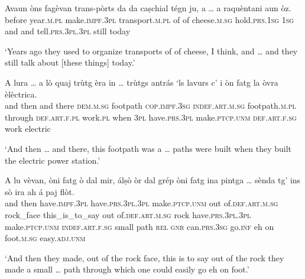 \begin{linenumbers}
\gll Avaun òns fagèvan trans-pòrts da da caṣchial\footnotemark{} tégn ju, a … a raquèntani aun òz.   \\
 before year.\textsc{m.pl} make.\textsc{impf.3pl} transport.\textsc{m.pl} of of cheese.\textsc{m.sg} hold.\textsc{prs.1sg} \textsc{1sg} and {} and  tell.\textsc{prs.3pl.3pl} still today\\
\end{linenumbers}
\medskip
\glt `Years ago they used to organize transports of of cheese, I think, and … and they still talk about [these things] today.'
\medskip

\begin{linenumbers}
\gll A lura … a lò quaj trùtg èra in … trùtgs antrás `ls lavurs c' i òn fatg la òvra èlèctrica.\\
and then {}  and there \textsc{dem.m.sg} footpath  \textsc{cop.impf.3sg} \textsc{indef.art.m.sg} {} footpath.\textsc{m.pl} through \textsc{def.art.f.pl}  work.\textsc{pl} when \textsc{3pl} have.\textsc{prs.3pl} make.\textsc{ptcp.unm} \textsc{def.art.f.sg} work electric \\
\end{linenumbers}
\medskip
\glt `And then … and there, this footpath was a … paths were built when they built the electric power station.'
\medskip

\begin{linenumbers}
\gll  A lu vèvan, òni fatg ò dal mir, álṣò òr dal grép òni fatg ina pintga …  sènda tg’ ins sò ira ah á paj flòt.\\
and then have.\textsc{impf.3pl} have.\textsc{prs.3pl.3pl} make.\textsc{ptcp.unm} out of.\textsc{def.art.m.sg} rock\_face this\_is\_to\_say out of.\textsc{def.art.m.sg} rock have.\textsc{prs.3pl.3pl} make.\textsc{ptcp.unm} \textsc{indef.art.f.sg} small {} path \textsc{rel} \textsc{gnr} can.\textsc{prs.3sg} go.\textsc{inf} eh on foot.\textsc{m.sg} easy.\textsc{adj.unm} \\
\end{linenumbers}
\medskip
\glt `And then they made, out of the rock face, this is to say out of the rock they made a small … path through which one could easily go eh on foot.'
\medskip 

